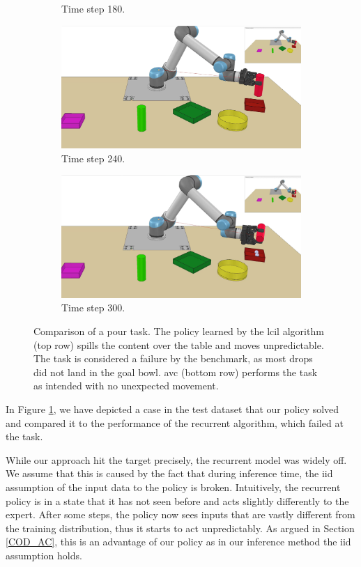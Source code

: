 \begin{figure}
\begin{subfigure}[t]{0.18\textwidth}
        \caption{Time step 180.}
    \end{subfigure}
    \begin{subfigure}[t]{0.18\textwidth}
        \includegraphics[width=\linewidth]{images/Language_Conditioned_Exp/mine_4.png}
        \caption{Time step 240.}
    \end{subfigure}
    \begin{subfigure}[t]{0.18\textwidth}
        \includegraphics[width=\linewidth]{images/Language_Conditioned_Exp/mine_5.png}
        \caption{Time step 300.}
    \end{subfigure}
    \caption{Comparison of a pour task. The policy learned by the \ac{lcil} algorithm (top row) spills the content over the table and moves unpredictable. The task is considered a failure 
    by the benchmark, as most drops did not land in the goal bowl. \ac{avc} (bottom row) performs the task as intended with no unexpected movement.}
    \label{fig: AVC vs. Rec}
\end{figure}
In Figure \ref{fig: AVC vs. Rec}, we have depicted a case in the test dataset that our policy solved and compared it to the performance 
of the recurrent algorithm, which failed at the task. 

While our approach hit the target precisely, the recurrent model was widely off. We assume that this is caused by the fact that during inference 
time, the
\ac{iid} assumption of the input data to the policy is broken. Intuitively, the recurrent policy
is in a state that it has not seen before and acts slightly differently to the expert. After some steps, the policy now sees 
inputs that are vastly
different from the training distribution, thus it starts to act unpredictably. As argued in Section \ref{COD_AC}, this is an advantage of our 
policy as in our inference method the \ac{iid} assumption holds.

